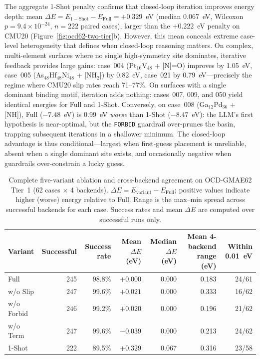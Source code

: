 The aggregate 1-Shot penalty confirms that closed-loop iteration improves energy depth: mean $\Delta E = E_{\mathrm{1-Shot}} - E_{\mathrm{Full}} = +0.329$~eV (median 0.067~eV, Wilcoxon $p = 9.4 \times 10^{-24}$, $n=222$ paired cases), larger than the $+0.222$~eV penalty on CMU20 (Figure~\ref{fig:ocd62-two-tier}b).
However, this mean conceals extreme case-level heterogeneity that defines when closed-loop reasoning matters.
On complex, multi-element surfaces where no single high-symmetry site dominates, iterative feedback provides large gains: case~004 (Pt$_{16}$V$_{48}$ + [N]=O) improves by 1.05~eV, case~005 (As$_{48}$Hf$_{48}$Ni$_{48}$ + [NH$_2$]) by 0.82~eV, case~021 by 0.79~eV---precisely the regime where CMU20 slip rates reach 71--77\%.
On surfaces with a single dominant binding motif, iteration adds nothing: cases~007, 009, and 050 yield identical energies for Full and 1-Shot.
Conversely, on case~008 (Ga$_{12}$Pd$_{36}$ + [NH]), Full ($-7.48$~eV) is 0.99~eV \emph{worse} than 1-Shot ($-8.47$~eV): the LLM's first hypothesis is near-optimal, but the \texttt{FORBID} guardrail over-prunes the basin, trapping subsequent iterations in a shallower minimum.
The closed-loop advantage is thus conditional---largest when first-guess placement is unreliable, absent when a single dominant site exists, and occasionally negative when guardrails over-constrain a lucky guess.

\begin{table}[t]
\centering
\scriptsize
\caption{Complete five-variant ablation and cross-backend agreement on OCD-GMAE62 Tier~1 (62 cases $\times$ 4 backends). $\Delta E = E_{\mathrm{variant}} - E_{\mathrm{Full}}$; positive values indicate higher (worse) energy relative to Full. Range is the max--min spread across successful backends for each case. Success rates and mean $\Delta E$ are computed over successful runs only.}
\label{tab:ocd62-tier1-full}
\begin{tabular}{lrrrrrr}
\toprule
Variant & Successful & Success rate & Mean $\Delta E$ (eV) & Median $\Delta E$ (eV) & Mean 4-backend range (eV) & Within 0.01~eV \\
\midrule
Full      & 245 & 98.8\% & $+0.000$ & 0.000 & 0.183 & 24/61 \\
w/o Slip & 247 & 99.6\% & $+0.021$ & $0.000$ & 0.333 & 16/62 \\
w/o Forbid & 246 & 99.2\% & $+0.020$ & $0.000$ & 0.196 & 21/62 \\
w/o Term & 247 & 99.6\% & $-0.039$ & $0.000$ & 0.213 & 24/62 \\
1-Shot    & 222 & 89.5\% & $+0.329$ & 0.067 & 0.316 & 23/58 \\
\bottomrule
\end{tabular}
\end{table}

